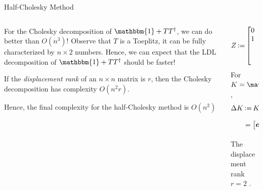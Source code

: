 \begin{frame}{Half-Cholesky Method}
    \begin{columns}
    \begin{column}{0.5\textwidth}
        For the Cholesky decomposition of $\mathbbm{1}+TT^\dagger$, we can do better than $O(n^3)$! Observe that $T$ is a Toeplitz, it can be fully characterized by $n\times 2$ numbers. Hence, we can expect that the LDL decomposition of $\mathbbm{1}+TT^\dagger$ should be faster!
        \begin{remark}[Displacement]
            If the \textit{displacement rank} of an $n\times n$ matrix is $r$, then the Cholesky decomposition has complexity $O(n^2r)$.
        \end{remark}
        Hence, the final complexity for the half-Cholesky method is $O(n^2)$
    \end{column}
    \begin{column}{0.5\textwidth}
        \begin{equation}
            Z \operatorname{\vcentcolon=} \left[\begin{matrix}
                0 \\
                1 & 0 \\
                & \ddots & \ddots \\
                & & 1 & 0
            \end{matrix}\right]
        \end{equation}
        For $K=\mathbbm{1} + TT^\dagger$,
        \begin{align}
            \Delta K &\operatorname{\vcentcolon=} K - ZKZ^{\mathsf{T}} = \boldsymbol{e}_0\boldsymbol{e}_0^\dagger + \boldsymbol{c}_0\boldsymbol{c}_0^\dagger \\
            &= \left[\begin{matrix}
                \boldsymbol{e}_0 & \boldsymbol{c}_0
            \end{matrix}\right] \left[\begin{matrix}
                \boldsymbol{e}_0^\dagger \\ \boldsymbol{c}_0^\dagger
            \end{matrix}\right] = G_0G_0^\dagger.
        \end{align}
        The displacement rank $r=2$ \cite{SAYED199549}.
    \end{column}
    \end{columns}
\end{frame} 


